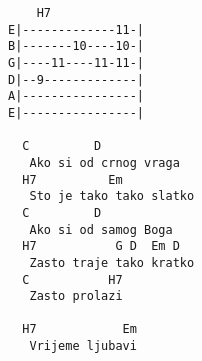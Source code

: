 \begin{verbatim}
    H7
E|-------------11-|
B|-------10----10-|
G|----11----11-11-|
D|--9-------------|
A|----------------|
E|----------------|

  C         D        
   Ako si od crnog vraga 
  H7          Em
   Sto je tako tako slatko
  C         D    
   Ako si od samog Boga
  H7           G D  Em D   
   Zasto traje tako kratko
  C           H7
   Zasto prolazi
   
  H7            Em 
   Vrijeme ljubavi 
\end{verbatim}
\newpage


